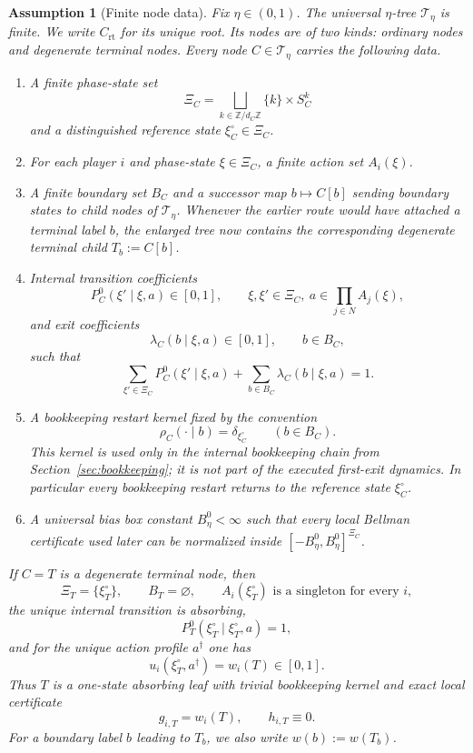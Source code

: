 \documentclass[12pt]{article}
\newtheorem{assumption}[theorem]{Assumption}
\theoremstyle{definition}
\newcommand{\1}{\mathbf{1}}
\newcommand{\cT}{\mathcal{T}}
\begin{document}
\begin{assumption}[Finite node data]
\label{ass:node-data}
Fix $\eta\in(0,1)$. The universal $\eta$-tree $\cT_\eta$ is finite. We write
$C_{\mathrm{rt}}$ for its unique root. Its nodes are of two kinds: ordinary nodes
and degenerate terminal nodes. Every node $C\in \cT_\eta$ carries the following
data.
\begin{enumerate}[label=\textnormal{(D\arabic*)},leftmargin=2.8em]
\item A finite phase-state set
\[
\Xi_C=\bigsqcup_{k\in\mathbb Z/d_C\mathbb Z}\{k\}\times S_C^k
\]
and a distinguished reference state $\xi_C^\circ\in\Xi_C$.
\item For each player $i$ and phase-state $\xi\in\Xi_C$, a finite action set
$A_i(\xi)$.
\item A finite boundary set $B_C$ and a successor map $b\mapsto C[b]$ sending
boundary states to child nodes of $\cT_\eta$. Whenever the earlier route would
have attached a terminal label $b$, the enlarged tree now contains the
corresponding degenerate terminal child $T_b:=C[b]$.
\item Internal transition coefficients
\[
P_C^0(\xi'\mid \xi,a)\in[0,1],
\qquad \xi,\xi'\in \Xi_C,
\ a\in \prod_{j\in N}A_j(\xi),
\]
and exit coefficients
\[
\lambda_C(b\mid \xi,a)\in[0,1],
\qquad b\in B_C,
\]
such that
\[
\sum_{\xi'\in\Xi_C}P_C^0(\xi'\mid \xi,a)+\sum_{b\in B_C}\lambda_C(b\mid\xi,a)=1.
\]
\item A bookkeeping restart kernel fixed by the convention
\[
\rho_C(\cdot\mid b)=\delta_{\xi_C^\circ}
\qquad (b\in B_C).
\]
This kernel is used only in the internal bookkeeping chain from
Section~\ref{sec:bookkeeping}; it is not part of the executed first-exit
dynamics. In particular every bookkeeping restart returns to the reference
state $\xi_C^\circ$.
\item A universal bias box constant $B_\eta^0<\infty$ such that every local
Bellman certificate used later can be normalized inside
$[-B_\eta^0,B_\eta^0]^{\Xi_C}$.
\end{enumerate}

If $C=T$ is a degenerate terminal node, then
\[
\Xi_T=\{\xi_T^\circ\},
\qquad
B_T=\varnothing,
\qquad
A_i(\xi_T^\circ)\text{ is a singleton for every }i,
\]
the unique internal transition is absorbing,
\[
P_T^0(\xi_T^\circ\mid \xi_T^\circ,a)=1,
\]
and for the unique action profile $a^\dagger$ one has
\[
u_i(\xi_T^\circ,a^\dagger)=w_i(T)\in[0,1].
\]
Thus $T$ is a one-state absorbing leaf with trivial bookkeeping kernel and exact
local certificate
\[
g_{i,T}=w_i(T),
\qquad
h_{i,T}\equiv 0.
\]
For a boundary label $b$ leading to $T_b$, we also write $w(b):=w(T_b)$.
\end{assumption}
\end{document}
